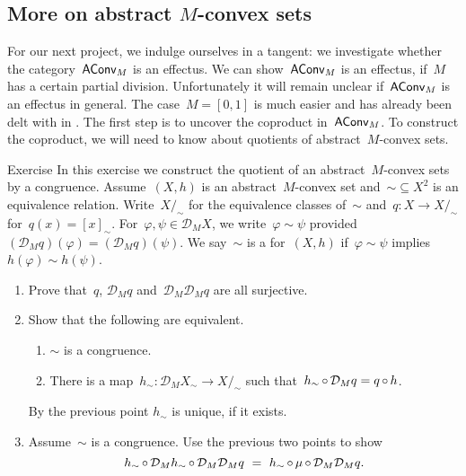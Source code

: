 \documentclass[b]{subfiles}
\begin{document}
\subsection{More on abstract $M$-convex sets}\label{more-aconvm}
\begin{parsec}%
\begin{point}%
For our next project,
    we indulge ourselves in a tangent:
    we investigate whether the category~$\mathsf{AConv}_M$ is an effectus.
We can show~$\mathsf{AConv}_M$ is an effectus, if~$M$ has a certain partial division.
Unfortunately it will remain unclear if~$\mathsf{AConv}_M$ is an effectus in general.
The case~$M=[0,1]$ is much easier and has already been delt with
        in \cite{statesofconvexsets}. 
The first step is to uncover the coproduct in~$\mathsf{AConv}_M$.
To construct the coproduct, we will need to know
    about quotients of abstract~$M$-convex sets.
\end{point}
\begin{point}{Exercise}%
In this exercise we construct the quotient of an
    abstract~$M$-convex sets by a congruence.
Assume~$(X,h)$ is an abstract~$M$-convex set
    and~$\sim \subseteq X^2$ is an equivalence relation.
Write~$X/_\sim$ for the equivalence classes
    of~$\sim$
    and~$q\colon X \to X/_\sim$
    for~$q(x) = [x]_\sim$.
For~$\varphi,\psi \in \mathcal{D}_M X$,
    we write~$\varphi \sim \psi$
    provided~$(\mathcal{D}_M q)(\varphi) = (\mathcal{D}_M q)(\psi)$.
We say~$\sim$ is a  for~$(X,h)$
if~$\varphi \sim \psi$ implies~$h(\varphi) \sim h(\psi)$.
\begin{enumerate}
\item
Prove that~$q$, $\mathcal{D}_M q$ and~$\mathcal{D}_M \mathcal{D}_M q$
    are all surjective.
\item
Show that the following are equivalent.
\begin{enumerate}
\item
$\sim$ is a congruence.
\item
There is a map~$h_\sim \colon \mathcal{D}_M X_\sim \to X/_\sim$
    such that~$h_\sim \mathop{\circ} \mathcal{D}_M q = q \mathop{\circ} h$.
\end{enumerate}
By the previous point $h_\sim$ is unique, if it exists.
\item
Assume~$\sim$ is a congruence.
Use the previous two points to show
\begin{equation*}
h_\sim \mathop{\circ} \mathcal{D}_M h_\sim \mathop{\circ} \mathcal{D}_M \mathcal{D}_M q
            \ =\  h_\sim \mathop{\circ} \mu \mathop{\circ} \mathcal{D}_M \mathcal{D}_M q.
\end{equation*}

\end{enumerate}
\end{point}
\end{parsec}
\end{document}
